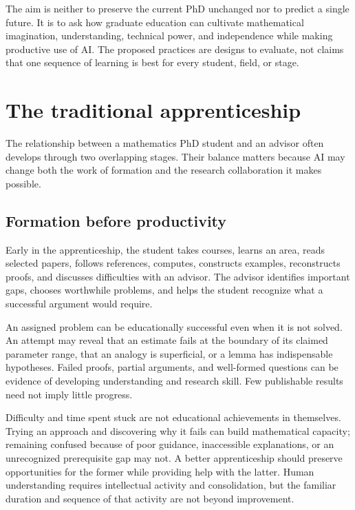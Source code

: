 \documentclass[11pt]{article}
\begin{document}
The aim is neither to preserve the current PhD unchanged nor to predict a single future.
It is to ask how graduate education can cultivate mathematical imagination, understanding,
technical power, and independence while making productive use of AI. The proposed
practices are designs to evaluate, not claims that one sequence of learning is best for
every student, field, or stage.

\section{The traditional apprenticeship}

The relationship between a mathematics PhD student and an advisor often develops through
two overlapping stages. Their balance matters because AI may change both the work of
formation and the research collaboration it makes possible.

\subsection{Formation before productivity}

Early in the apprenticeship, the student takes courses, learns an area, reads selected
papers, follows references, computes, constructs examples, reconstructs proofs, and
discusses difficulties with an advisor. The advisor identifies important gaps, chooses
worthwhile problems, and helps the student recognize what a successful argument would
require.

An assigned problem can be educationally successful even when it is not solved. An
attempt may reveal that an estimate fails at the boundary of its claimed parameter range,
that an analogy is superficial,
or a lemma has indispensable hypotheses. Failed proofs, partial arguments, and
well-formed questions can be evidence of developing understanding and research skill.
Few publishable results need not imply little progress.

Difficulty and time spent stuck are not educational achievements in themselves.
Trying an approach and discovering why it fails can build mathematical capacity;
remaining confused because of poor guidance, inaccessible explanations, or an
unrecognized prerequisite gap may not. A better apprenticeship should preserve
opportunities for the former while providing help with the latter. Human understanding requires intellectual activity and consolidation, but the
familiar duration and sequence of that activity are not beyond improvement.
\end{document}
